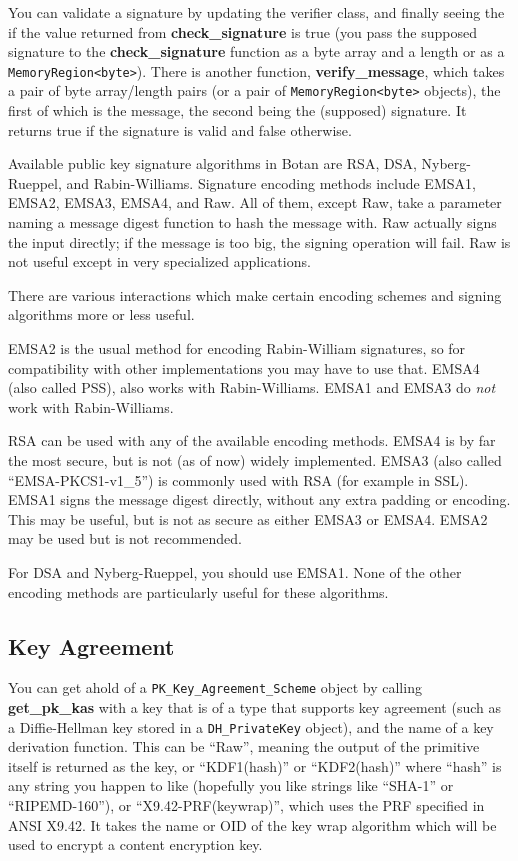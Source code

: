 \documentclass{article}
\newcommand{\function}[1]{\textbf{#1}}
\newcommand{\type}[1]{\texttt{#1}}
\begin{document}
You can validate a signature by updating the verifier class, and finally seeing
the if the value returned from \function{check\_signature} is true (you pass
the supposed signature to the \function{check\_signature} function as a byte
array and a length or as a \type{MemoryRegion<byte>}). There is another
function, \function{verify\_message}, which takes a pair of byte array/length
pairs (or a pair of \type{MemoryRegion<byte>} objects), the first of which is
the message, the second being the (supposed) signature. It returns true if the
signature is valid and false otherwise.

Available public key signature algorithms in Botan are RSA, DSA,
Nyberg-Rueppel, and Rabin-Williams. Signature encoding methods include EMSA1,
EMSA2, EMSA3, EMSA4, and Raw. All of them, except Raw, take a parameter naming
a message digest function to hash the message with. Raw actually signs the
input directly; if the message is too big, the signing operation will fail. Raw
is not useful except in very specialized applications.

There are various interactions which make certain encoding schemes and signing
algorithms more or less useful.

EMSA2 is the usual method for encoding Rabin-William signatures, so for
compatibility with other implementations you may have to use that. EMSA4 (also
called PSS), also works with Rabin-Williams. EMSA1 and EMSA3 do \emph{not} work
with Rabin-Williams.

RSA can be used with any of the available encoding methods. EMSA4 is by far the
most secure, but is not (as of now) widely implemented. EMSA3 (also called
``EMSA-PKCS1-v1\_5'') is commonly used with RSA (for example in SSL). EMSA1
signs the message digest directly, without any extra padding or encoding. This
may be useful, but is not as secure as either EMSA3 or EMSA4. EMSA2 may be used
but is not recommended.

For DSA and Nyberg-Rueppel, you should use EMSA1. None of the other encoding
methods are particularly useful for these algorithms.

\subsection{Key Agreement}

You can get ahold of a \type{PK\_Key\_Agreement\_Scheme} object by calling
\function{get\_pk\_kas} with a key that is of a type that supports key
agreement (such as a Diffie-Hellman key stored in a \type{DH\_PrivateKey}
object), and the name of a key derivation function. This can be ``Raw'',
meaning the output of the primitive itself is returned as the key, or
``KDF1(hash)'' or ``KDF2(hash)'' where ``hash'' is any string you happen to
like (hopefully you like strings like ``SHA-1'' or ``RIPEMD-160''), or
``X9.42-PRF(keywrap)'', which uses the PRF specified in ANSI X9.42. It takes
the name or OID of the key wrap algorithm which will be used to encrypt a
content encryption key.
\end{document}
